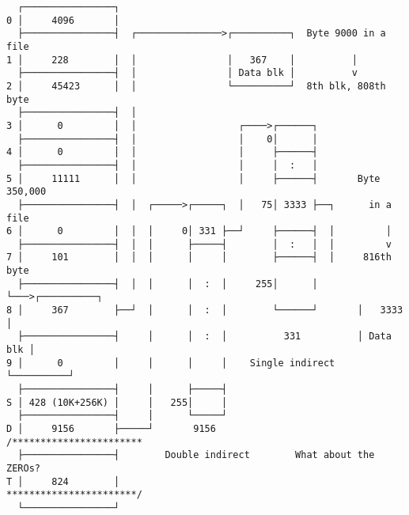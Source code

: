 \documentclass[varwidth=50em,crop]{standalone}
\begin{document}
\begin{verbatim}
  ┌────────────────┐
0 │     4096       │
  ├────────────────┤  ┌───────────────>┌──────────┐  Byte 9000 in a file
1 │     228        │  │                │   367    │          │
  ├────────────────┤  │                │ Data blk │          v
2 │     45423      │  │                └──────────┘  8th blk, 808th byte
  ├────────────────┤  │
3 │      0         │  │                  ┌────>┌──────┐
  ├────────────────┤  │                  │    0│      │
4 │      0         │  │                  │     ├──────┤
  ├────────────────┤  │                  │     │  :   │
5 │     11111      │  │                  │     ├──────┤       Byte 350,000
  ├────────────────┤  │  ┌─────>┌─────┐  │   75│ 3333 ├──┐      in a file
6 │      0         │  │  │     0│ 331 ├──┘     ├──────┤  │         │
  ├────────────────┤  │  │      ├─────┤        │  :   │  │         v
7 │     101        │  │  │      │     │        ├──────┤  │     816th byte
  ├────────────────┤  │  │      │  :  │     255│      │  └───>┌──────────┐
8 │     367        ├──┘  │      │  :  │        └──────┘       │   3333   │
  ├────────────────┤     │      │  :  │          331          │ Data blk │
9 │      0         │     │      │     │    Single indirect    └──────────┘
  ├────────────────┤     │      ├─────┤
S │ 428 (10K+256K) │     │   255│     │
  ├────────────────┤     │      └─────┘
D │     9156       ├─────┘       9156            /***********************
  ├────────────────┤        Double indirect        What about the ZEROs?
T │     824        │                              ***********************/
  └────────────────┘
\end{verbatim}
\end{document}
